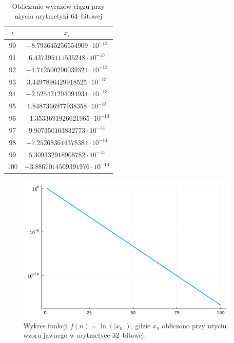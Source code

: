 \documentclass{article}
\begin{document}
\begin{table}[!h]
    \centering
     \begin{tabular}{|c|c|}
            \hline
             \(i\) & \(x_i\) \\
             \hline\hline 
            90 &  \(-8.793645256554909 \cdot 10^{-13}\) \\
            91 &  \(6.437395111535248 \cdot 10^{-13} \) \\
            92 &  \(-4.712500290039321 \cdot 10^{-13} \) \\
            93 &  \(3.4497896429918525 \cdot 10^{-13}\) \\
            94 &  \(-2.525421294094934 \cdot 10^{-13} \) \\
            95 &  \(1.8487366977938358 \cdot 10^{-13} \) \\
            96 &  \(-1.3533691926021965 \cdot 10^{-13} \) \\
            97 &  \(9.907350103832773 \cdot 10^{-14} \) \\
            98 &  \(-7.252683644378381 \cdot 10^{-14} \) \\
            99 &  \(5.309332918908782 \cdot 10^{-14} \) \\
            100 &  \(-3.8867014509391976 \cdot 10^{-14} \) \\
            \hline
        \end{tabular}
    \caption{Obliczanie wyrazów ciągu przy użyciu arytmetyki 64--bitowej}
    \label{tab:expl_64}
\end{table}



\newpage

\begin{figure}[!h]
    \centering
    \includegraphics[scale=0.4]{plot32_log_2.png}
    \caption{Wykres funkcji \(f(n) = \ln(|x_n|)\), gdzie \(x_n\) obliczono przy użyciu wzoru jawnego w arytmetyce 32--bitowej.}
    \label{fig:plot32_log_2}
\end{figure}
\end{document}
